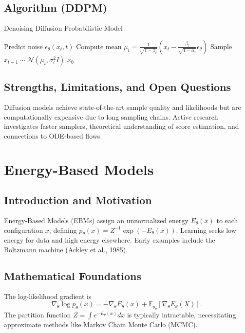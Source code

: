\documentclass[11pt]{book}
\begin{document}
\subsection{Algorithm (DDPM)}
\begin{algorithm}
\caption{Denoising Diffusion Probabilistic Model}
\begin{algorithmic}[1]
    \STATE Predict noise $\epsilon_\theta(x_t,t)$
    \STATE Compute mean $\mu_t=\frac{1}{\sqrt{1-\beta_t}}(x_t-\frac{\beta_t}{\sqrt{1-\bar{\alpha}_t}}\epsilon_\theta)$
    \STATE Sample $x_{t-1}\sim\mathcal{N}(\mu_t,\sigma_t^2 I)$
\ENDFOR
\RETURN $x_0$
\end{algorithmic}
\end{algorithm}

\subsection{Strengths, Limitations, and Open Questions}
Diffusion models achieve state-of-the-art sample quality and likelihoods but are computationally expensive due to long sampling chains. Active research investigates faster samplers, theoretical understanding of score estimation, and connections to ODE-based flows.

\section{Energy-Based Models}
\subsection{Introduction and Motivation}
Energy-Based Models (EBMs) assign an unnormalized energy $E_\theta(x)$ to each configuration $x$, defining $p_\theta(x)=Z^{-1}\exp(-E_\theta(x))$. Learning seeks low energy for data and high energy elsewhere. Early examples include the Boltzmann machine (Ackley et al., 1985).

\subsection{Mathematical Foundations}
The log-likelihood gradient is
\begin{equation}
\nabla_\theta \log p_\theta(x)= -\nabla_\theta E_\theta(x)+\mathbb{E}_{p_\theta}[\nabla_\theta E_\theta(X)].
\end{equation}
The partition function $Z=\int e^{-E_\theta(x)}dx$ is typically intractable, necessitating approximate methods like Markov Chain Monte Carlo (MCMC).
\end{document}
